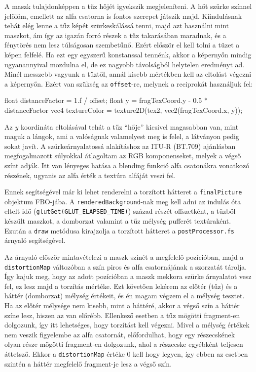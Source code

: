 A maszk tulajdonképpen a tűz hőjét igyekszik megjeleníteni. A hőt szürke színnel jelölöm, emellett az alfa csatorna is fontos szerepet játszik majd. Kiindulásnak tehát elég lenne a tűz képét szürkeskálássá tenni, majd azt használni mint maszkot, ám így az igazán forró részek a tűz takarásában maradnak, és a fénytörés nem lesz túlságosan szembetűnő. Ezért először el kell tolni a tüzet a képen felfelé. Ha ezt egy egyszerű konstanssal tennénk, akkor a képernyőn mindig ugyanannyival mozdulna el, de ez nagyobb távolságból helytelen eredményt ad. Minél messzebb vagyunk a tűztől, annál kisebb mértékben kell az eltolást végezni a képernyőn. Ezért van szükség az \texttt{offset}-re, melynek a reciprokát használjuk fel:
\begin{cpp}
float distanceFactor = 1.f / offset;
float y = fragTexCoord.y - 0.5 * distanceFactor
vec4 textureColor = texture2D(tex2, vec2(fragTexCoord.x, y));
\end{cpp}
Az $y$ koordináta eltolásával tehát a tűz ``hője'' kicsivel magasabban van, mint maguk a lángok, ami a valóságnak valamelyest meg is felel, a látványon pedig sokat javít. A szürkeárnyalatossá alakításhoz az ITU-R (BT.709) ajánlásban megfogalmazott súlyokkal átlagoltam az RGB komponenseket, melyek a végső színt adják. Itt van lényeges hatása a blending funkció alfa csatonákra vonatkozó részének, ugyanis az alfa érték a textúra alfáját veszi fel.

Ennek segítségével már ki lehet renderelni a torzított hátteret a \texttt{finalPicture} objektum FBO-jába. A \texttt{renderedBackground}-nak meg kell adni az indulás óta eltelt idő (\texttt{glutGet(GLUT\_ELAPSED\_TIME)}) század részét offszetként, a tűzből készült maszkot, a domborzat valamint a tűz mélység pufferét textúraként. Ezután a \texttt{draw} metódusa kirajzolja a torzított hátteret a \texttt{postProcessor.fs} árnyaló segítségével.

Az árnyaló először mintavételezi a maszk színét a megfelelő pozícióban, majd a \texttt{distortionMap} változóban a szín piros és alfa csatornájának a szorzatát tárolja. Így kajuk meg, hogy az adott pozícióban a maszk mekkora szürke árnyalatot vesz fel, ez lesz majd a torzítás mértéke. 
Ezt követően lekérem az előtér (tűz) és a háttér (domborzat) mélység értékeit, és én magam végzem el a mélység tesztet. Ha az előtér mélysége nem kisebb, mint a háttéré, akkor a végső szín a háttér színe lesz, hiszen az van előrébb. Ellenkező esetben a tűz mögötti fragment-en dolgozunk, így itt lehetséges, hogy torzítást kell végezni. Mivel a mélység értékek nem veszik figyelembe az alfa csatornát, előfordulhat, hogy egy részecskének olyan része mögötti fragment-en dolgozunk, ahol a részecske egyébként teljesen áttetsző. Ekkor a \texttt{distortionMap} értéke $0$ kell hogy legyen, így ebben az esetben szintén a háttér megfelelő fragment-je lesz a végső szín. 

